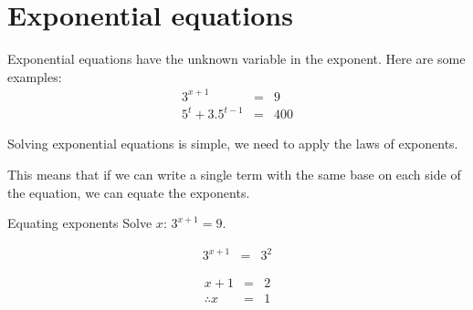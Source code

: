 \section{Exponential equations}

Exponential equations have the unknown variable in the exponent. Here are some examples:
\begin{eqnarray*}
 3^{x+1} & = & 9 \\
5^t + 3 . 5^{t-1} & = & 400
\end{eqnarray*}

Solving exponential equations is simple, we need to apply the laws of exponents.



This means that if we can write a single term with the same base on each side of the equation, we can equate the exponents.


\begin{wex}
{%
Equating exponents
}
{%
Solve $x$:
$ 3^{x+1} = 9. $
}
{%

\begin{eqnarray*}
 3^{x+1} & = & 3^2 
\end{eqnarray*}

\begin{eqnarray*}
 {x+1} & = & 2 \\
\therefore x & = & 1
\end{eqnarray*}
}
\end{wex}




